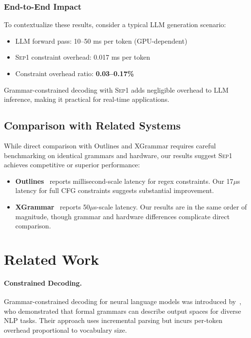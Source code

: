 \documentclass[11pt,a4paper]{article}
\newcommand{\sep}{\textsc{Sep1}}
\theoremstyle{plain}
\theoremstyle{definition}
\theoremstyle{remark}
\begin{document}
\subsubsection{End-to-End Impact}

To contextualize these results, consider a typical LLM generation scenario:
\begin{itemize}
\item LLM forward pass: 10--50 ms per token (GPU-dependent)
\item \sep{} constraint overhead: 0.017 ms per token
\item Constraint overhead ratio: \textbf{0.03--0.17\%}
\end{itemize}

Grammar-constrained decoding with \sep{} adds negligible overhead to LLM inference, making it practical for real-time applications.

\subsection{Comparison with Related Systems}

While direct comparison with Outlines and XGrammar requires careful benchmarking on identical grammars and hardware, our results suggest \sep{} achieves competitive or superior performance:

\begin{itemize}
\item \textbf{Outlines}~\citep{willard2023outlines} reports millisecond-scale latency for regex constraints. Our 17$\mu$s latency for full CFG constraints suggests substantial improvement.
\item \textbf{XGrammar}~\citep{dong2024xgrammar} reports 50$\mu$s-scale latency. Our results are in the same order of magnitude, though grammar and hardware differences complicate direct comparison.
\end{itemize}

\section{Related Work}
\label{sec:related-work}

\paragraph{Constrained Decoding.}
Grammar-constrained decoding for neural language models was introduced by~\citet{geng2023gcd}, who demonstrated that formal grammars can describe output spaces for diverse NLP tasks. Their approach uses incremental parsing but incurs per-token overhead proportional to vocabulary size.
\end{document}
